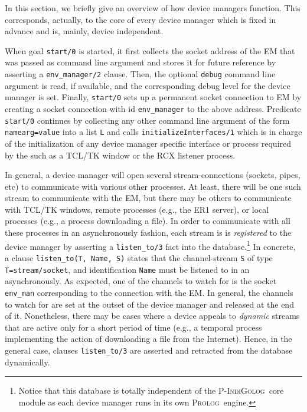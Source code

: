 \documentclass[11pt]{article}
\newcommand{\PIndiGolog}{\mbox{\textsc{P-IndiGolog}}}
\newcommand{\Prolog}{\mbox{\textsc{Prolog}}}
\begin{document}
In this section, we briefly give an overview of how device managers function.
This corresponds, actually, to the core of every device manager which is
fixed in advance and is, mainly, device independent.

When goal \texttt{start/0} is started, it first collects the socket address of
the EM that was passed as command line argument and stores it for future
reference by asserting a \texttt{env\_manager/2} clause.
%
Then, the optional \texttt{debug} command line argument is read, if available,
and the corresponding debug level for the device manager is set.
%
Finally, \texttt{start/0} sets up a permanent socket connection to EM by
creating a socket connection with id \texttt{env\_manager} to the above
address.
%
Predicate \texttt{start/0} continues by collecting any other command line
argument of the form \texttt{namearg=value} into a list \texttt{L} and calls
\texttt{initializeInterfaces/1} which is in charge of the initialization of any
device manager specific interface or process required by the such as a TCL/TK
window or the RCX listener process.


In general, a device manager will open several stream-connections (sockets,
pipes, etc) to communicate with various other processes. At least, there will
be one such stream to communicate with the EM, but there may be others to
communicate with TCL/TK windows, remote processes (e.g., the ER1 server), or
local processes (e.g., a process downloading a file).
%
In order to communicate with all these processes in an asynchronously
fashion, each stream is is \textit{registered} to the device manager by
asserting a \texttt{listen\_to/3} fact into the database.\footnote{Notice
  that this database is totally independent of the \PIndiGolog\ core module as
  each device manager runs in its own \Prolog\ engine.} 
%
In concrete, a clause \texttt{listen\_to(T, Name, S)} states that the
channel-stream \texttt{S} of type \texttt{T=stream/socket}, and identification
\texttt{Name} must be listened to in an asynchronously.
%
As expected, one of the channels to watch for is the socket 
\texttt{env\_man} corresponding to the connection with the EM. In
general, the channels to watch for are set at the outset of the device manager
and released at the end of it. Nonetheless, there may be cases where a
device appeals to \textit{dynamic} streams that are active only for a
short period of time (e.g., a temporal process implementing the action of
downloading a file from the Internet). Hence, in the general case,
clauses \texttt{listen\_to/3} are asserted and retracted from the database
dynamically.
\end{document}
